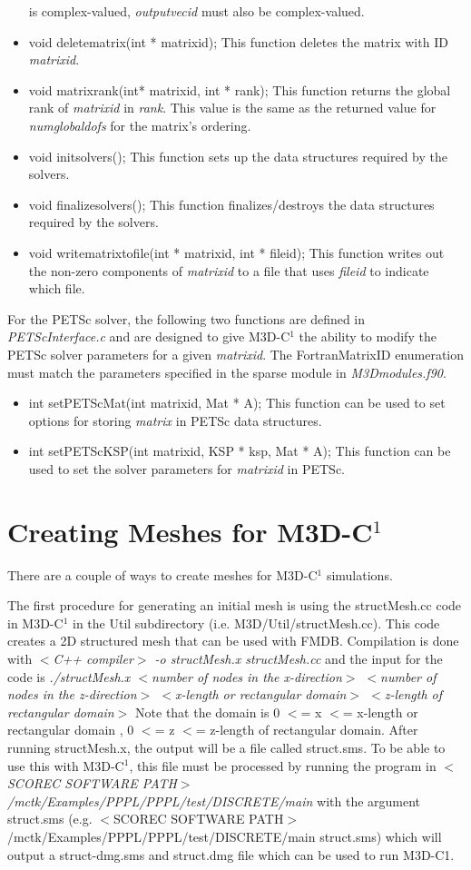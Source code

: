 \begin{itemize}
is complex-valued, \textit{outputvecid} must also be complex-valued.
\item  void deletematrix(int * matrixid);  This function deletes the matrix with ID \textit{matrixid}.
\item  void matrixrank(int* matrixid, int * rank);  This function returns the global rank of \textit{matrixid}
in \textit{rank}.  This value is the same as the returned value for \textit{numglobaldofs} for the matrix's
ordering.
\item  void initsolvers();  This function sets up the data structures required by the solvers.
\item  void finalizesolvers();  This function finalizes/destroys the data structures required by the solvers.
\item  void writematrixtofile(int * matrixid, int * fileid);  This function writes out the non-zero components
of \textit{matrixid} to a file that uses \textit{fileid} to indicate which file.
\end{itemize}
For the PETSc solver, the following two functions are defined in \textit{PETScInterface.c} and are designed
to give M3D-C$^1$ the ability to modify the PETSc solver parameters for a given \textit{matrixid}.  
The FortranMatrixID enumeration must match the parameters specified in the sparse module in \textit{M3Dmodules.f90}.
\begin{itemize}
\item  int setPETScMat(int matrixid, Mat * A);  This function can be used to set options for storing \textit{matrix}
in PETSc data structures.
\item int setPETScKSP(int matrixid, KSP * ksp, Mat * A); This function can be used to set the solver
parameters for \textit{matrixid} in PETSc.
\end{itemize}

\chapter{Creating Meshes for M3D-C$^1$}
There are a couple of ways to create meshes for M3D-C$^1$ simulations.  

The first procedure for generating an initial mesh is using the 
structMesh.cc code in 
M3D-C$^1$ in the Util subdirectory (i.e. M3D/Util/structMesh.cc).  This code
 creates a 2D structured mesh that can be used with FMDB.  Compilation is done with
 \textit{$<$C++ compiler$>$ -o structMesh.x structMesh.cc} and the input for the code is
\textit{./structMesh.x $<$number of nodes in the x-direction$>$ $<$number of nodes in the z-direction$>$ 
$<$x-length or rectangular domain$>$ $<$z-length of rectangular domain$>$}
Note that the domain is 0 $<$= x $<$= x-length or rectangular domain , 0 $<$= z $<$= z-length of rectangular domain.
After running structMesh.x, the output will be a file called struct.sms.  To be
able to use this with M3D-C$^1$, this file must be processed by running the program
in \textit{$<$SCOREC SOFTWARE PATH$>$/mctk/Examples/PPPL/PPPL/test/DISCRETE/main} with the argument struct.sms 
(e.g. $<$SCOREC SOFTWARE PATH$>$/mctk/Examples/PPPL/PPPL/test/DISCRETE/main struct.sms)
which will output a struct-dmg.sms and struct.dmg file which can be used to
run M3D-C1.


